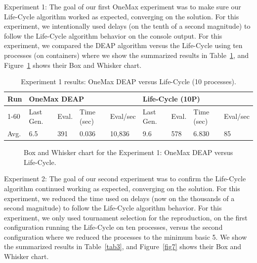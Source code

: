 \documentclass[runningheads]{llncs}
\begin{document}
Experiment 1: The goal of our first OneMax experiment was to make sure our
Life-Cycle algorithm worked as expected, converging on the solution. For this
experiment, we intentionally used delays (on the tenth of a second magnitude)
to follow the Life-Cycle algorithm behavior on the console output. For this
experiment, we compared the DEAP algorithm versus the Life-Cycle using ten
processes (on containers) where we show the summarized results in Table~\ref{tab2}, and
Figure~\ref{fig6} shows their Box and Whisker chart.

\begin{table}[]
    \centering        
    \caption{Experiment 1 results: OneMax DEAP versus Life-Cycle (10 processes).}\label{tab2}
    \begin{tabular}{|l|l|l|l|l|l|l|l|l|}
    \hline
    Run & \multicolumn{4}{l|}{OneMax DEAP} & \multicolumn{4}{l|}{Life-Cycle (10P)} \\ \hline
    1-60 & Last Gen. & Eval. & Time (sec) & Eval/sec & Last Gen. & Eval. & Time (sec) & Eval/sec \\ \hline
    Avg. & 6.5 & 391 & 0.036 & 10,836 & 9.6 & 578 & 6.830 & 85 \\ \hline
    \end{tabular}
    \end{table}

\begin{figure}
    \caption{Box and Whisker chart for the Experiment 1: OneMax DEAP versus Life-Cycle.} \label{fig6}
    \end{figure}


Experiment 2: The goal of our second experiment was to confirm the Life-Cycle
algorithm continued working as expected, converging on the solution. For this
experiment, we reduced the time used on delays (now on the thousands of a
second magnitude) to follow the Life-Cycle algorithm behavior. For this
experiment, we only used tournament selection for the reproduction, on the
first configuration running the Life-Cycle on ten processes, versus the second
configuration where we reduced the processes to the minimum basic 5. We show
the summarized results in Table~\ref{tab3}, and Figure~\ref{fig7} shows their Box and Whisker
chart.
\end{document}
